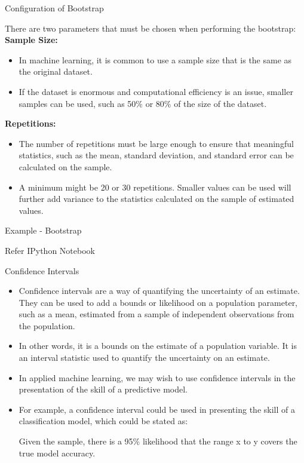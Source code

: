 \documentclass{beamer}
\begin{document}
\begin{frame}{Configuration of Bootstrap}
\begin{flushleft}
	There are two parameters that must be chosen when performing the bootstrap: \\
\vspace{10pt}
\textbf{Sample Size:}
	\begin{itemize}
		\item In machine learning, it is common to use a sample size that is the same as the original dataset.
		\item If the dataset is enormous and computational efficiency is an issue, smaller samples can be used, such as 50\% or 80\% of the size of the dataset.
	\end{itemize}
	\textbf{Repetitions:}

	\begin{itemize}
		\item The number of repetitions must be large enough to ensure that meaningful statistics, such as the mean, standard deviation, and standard error can be calculated on the sample.
		\item A minimum might be 20 or 30 repetitions. Smaller values can be used will further add variance to the statistics calculated on the sample of estimated values.
	\end{itemize}
\end{flushleft}
\end{frame}

\begin{frame}{Example - Bootstrap}
	\huge{\centerline{Refer IPython Notebook}}
\end{frame}

\begin{frame}{Confidence Intervals}
	\begin{itemize}
		\item Confidence intervals are a way of quantifying the uncertainty of an estimate. They can be used to add a bounds or likelihood on a population parameter, such as a mean, estimated from a sample of independent observations from the population.
		\item In other words, it is a bounds on the estimate of a population variable. It is an interval statistic used to quantify the uncertainty on an estimate.
		\item In applied machine learning, we may wish to use confidence intervals in the presentation of the skill of a predictive model.
		\item For example, a confidence interval could be used in presenting the skill of a classification model, which could be stated as:

Given the sample, there is a 95\% likelihood that the range x to y covers the true model accuracy.
	\end{itemize}
\end{frame}
\end{document}
